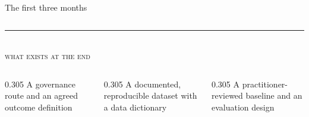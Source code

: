 \documentclass[aspectratio=169,11pt]{beamer}
\begin{document}
\begin{frame}{The first three months}
\begin{columns}[T,onlytextwidth]
  \end{columns}

  \vspace{2mm}
  {\color{inktwo!25}\rule{\textwidth}{0.6pt}}\\[1mm]
  {\color{inktwo}\scriptsize\textsc{what exists at the end}}\\[0.8mm]

  \begin{columns}[T,onlytextwidth]
    \begin{column}{0.305\textwidth}
      \scriptsize A governance route and an agreed outcome definition
    \end{column}
    \begin{column}{0.305\textwidth}
      \scriptsize A documented, reproducible dataset with a data dictionary
    \end{column}
    \begin{column}{0.305\textwidth}
      \scriptsize A practitioner-reviewed baseline and an evaluation design
    \end{column}
  \end{columns}
  \vspace{1mm}
\end{frame}
\end{document}
